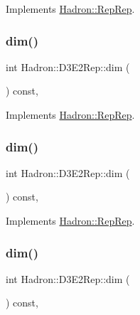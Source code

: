 Implements \mbox{\hyperlink{structHadron_1_1RepRep_a92c8802e5ed7afd7da43ccfd5b7cd92b}{Hadron\+::\+Rep\+Rep}}.

\mbox{\label{structHadron_1_1D3E2Rep_a79f191ce59b4b506979041561fd3efd1}} 
\subsubsection{\texorpdfstring{dim()}{dim()}\hspace{0.1cm}{\footnotesize\ttfamily [3/5]}}
{\footnotesize\ttfamily int Hadron\+::\+D3\+E2\+Rep\+::dim (\begin{DoxyParamCaption}{ }\end{DoxyParamCaption}) const\hspace{0.3cm}{\ttfamily [inline]}, {\ttfamily [virtual]}}



Implements \mbox{\hyperlink{structHadron_1_1RepRep_a92c8802e5ed7afd7da43ccfd5b7cd92b}{Hadron\+::\+Rep\+Rep}}.

\mbox{\label{structHadron_1_1D3E2Rep_a79f191ce59b4b506979041561fd3efd1}} 
\subsubsection{\texorpdfstring{dim()}{dim()}\hspace{0.1cm}{\footnotesize\ttfamily [4/5]}}
{\footnotesize\ttfamily int Hadron\+::\+D3\+E2\+Rep\+::dim (\begin{DoxyParamCaption}{ }\end{DoxyParamCaption}) const\hspace{0.3cm}{\ttfamily [inline]}, {\ttfamily [virtual]}}



Implements \mbox{\hyperlink{structHadron_1_1RepRep_a92c8802e5ed7afd7da43ccfd5b7cd92b}{Hadron\+::\+Rep\+Rep}}.

\mbox{\label{structHadron_1_1D3E2Rep_a79f191ce59b4b506979041561fd3efd1}} 
\subsubsection{\texorpdfstring{dim()}{dim()}\hspace{0.1cm}{\footnotesize\ttfamily [5/5]}}
{\footnotesize\ttfamily int Hadron\+::\+D3\+E2\+Rep\+::dim (\begin{DoxyParamCaption}{ }\end{DoxyParamCaption}) const\hspace{0.3cm}{\ttfamily [inline]}, {\ttfamily [virtual]}}



